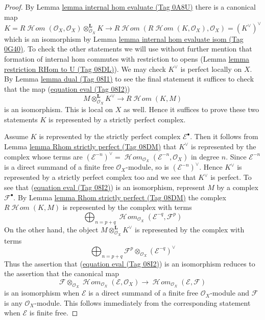 \documentclass{amsart}
\theoremstyle{plain}
\theoremstyle{definition}
\theoremstyle{remark}
\numberwithin{equation}{subsection}
\def\SheafHom{\mathop{\mathcal{H}\!\mathit{om}}\nolimits}
\begin{document}
\begin{proof}
By Lemma \href{https://stacks.math.columbia.edu/tag/0A8U}{lemma internal hom evaluate (Tag 0A8U)} there is a canonical map
$$
K = R\SheafHom(\mathcal{O}_X, \mathcal{O}_X)
\otimes_{\mathcal{O}_X}^\mathbf{L} K \longrightarrow
R\SheafHom(R\SheafHom(K, \mathcal{O}_X), \mathcal{O}_X) =
(K^\vee)^\vee
$$
which is an isomorphism by Lemma \href{https://stacks.math.columbia.edu/tag/0G40}{lemma internal hom evaluate isom (Tag 0G40)}.
To check the other statements we will use without further mention that
formation of internal hom commutes with restriction to opens
(Lemma \href{https://stacks.math.columbia.edu/tag/08DL}{lemma restriction RHom to U (Tag 08DL)}).
We may check $K^\vee$ is perfect locally on $X$.
By Lemma \href{https://stacks.math.columbia.edu/tag/08I1}{lemma dual (Tag 08I1)}
to see the final statement it suffices to check that the map
(\href{https://stacks.math.columbia.edu/tag/08I2}{equation eval (Tag 08I2)})
$$
M \otimes^\mathbf{L}_{\mathcal{O}_X} K^\vee
\longrightarrow
R\SheafHom(K, M)
$$
is an isomorphism. This is local on $X$ as well.
Hence it suffices to prove these two statements $K$ is represented
by a strictly perfect complex.

\medskip\noindent
Assume $K$ is represented by the strictly perfect complex
$\mathcal{E}^\bullet$. Then it follows from
Lemma \href{https://stacks.math.columbia.edu/tag/08DM}{lemma Rhom strictly perfect (Tag 08DM)}
that $K^\vee$ is represented by the complex whose terms are
$(\mathcal{E}^{-n})^\vee =
\SheafHom_{\mathcal{O}_X}(\mathcal{E}^{-n}, \mathcal{O}_X)$
in degree $n$. Since $\mathcal{E}^{-n}$ is a direct summand of a finite
free $\mathcal{O}_X$-module, so is $(\mathcal{E}^{-n})^\vee$.
Hence $K^\vee$ is represented by a strictly perfect complex too
and we see that $K^\vee$ is perfect.
To see that (\href{https://stacks.math.columbia.edu/tag/08I2}{equation eval (Tag 08I2)}) is an isomorphism, represent
$M$ by a complex $\mathcal{F}^\bullet$.
By Lemma \href{https://stacks.math.columbia.edu/tag/08DM}{lemma Rhom strictly perfect (Tag 08DM)} the complex
$R\SheafHom(K, M)$ is represented by the complex with terms
$$
\bigoplus\nolimits_{n = p + q}
\SheafHom_{\mathcal{O}_X}(\mathcal{E}^{-q}, \mathcal{F}^p)
$$
On the other hand, the object $M \otimes^\mathbf{L}_{\mathcal{O}_X} K^\vee$
is represented by the complex with terms
$$
\bigoplus\nolimits_{n = p + q}
\mathcal{F}^p \otimes_{\mathcal{O}_X} (\mathcal{E}^{-q})^\vee
$$
Thus the assertion that (\href{https://stacks.math.columbia.edu/tag/08I2}{equation eval (Tag 08I2)}) is an isomorphism
reduces to the assertion that the canonical map
$$
\mathcal{F}
\otimes_{\mathcal{O}_X}
\SheafHom_{\mathcal{O}_X}(\mathcal{E}, \mathcal{O}_X)
\longrightarrow
\SheafHom_{\mathcal{O}_X}(\mathcal{E}, \mathcal{F})
$$
is an isomorphism when $\mathcal{E}$ is a direct summand of a finite
free $\mathcal{O}_X$-module and $\mathcal{F}$ is any $\mathcal{O}_X$-module.
This follows immediately from the corresponding statement when
$\mathcal{E}$ is finite free.
\end{proof}
\end{document}
